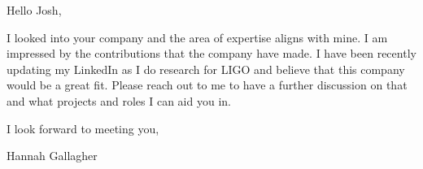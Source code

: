 Hello Josh, 

I looked into your company and the area of expertise aligns with mine. I am impressed by the contributions that the company have made. I have been recently updating my LinkedIn as I do research for LIGO and believe that this company would be a great fit. Please reach out to me to have a further discussion on that and what projects and roles I can aid you in. 



I look forward to meeting you, 

Hannah Gallagher